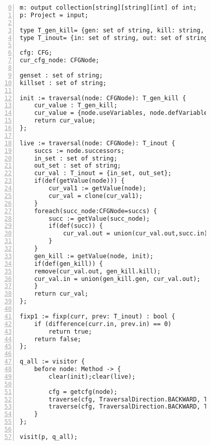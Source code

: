 \begin{figure}[ht!]
\begin{lstlisting}[numbers=left, tabsize=4, escapechar=@, caption={Live variable analysis},label={lst:live-variable},firstline=0, firstnumber=0, lastline = 55] 
m: output collection[string][string][int] of int;
p: Project = input;

type T_gen_kill= {gen: set of string, kill: string, dummy : int};
type T_inout= {in: set of string, out: set of string};

cfg: CFG;
cur_cfg_node: CFGNode;

genset : set of string;
killset : set of string;

init := traversal(node: CFGNode): T_gen_kill {
	cur_value : T_gen_kill;
	cur_value = {node.useVariables, node.defVariables, 0};
	return cur_value;
};

live := traversal(node: CFGNode): T_inout {
	succs := node.successors;
	in_set : set of string;
	out_set : set of string;
	cur_val : T_inout = {in_set, out_set};
	if(def(getValue(node))) {
		cur_val1 := getValue(node);
		cur_val = clone(cur_val1);
	}
	foreach(succ_node:CFGNode=succs) {
		succ := getValue(succ_node);
		if(def(succ)) {
			cur_val.out = union(cur_val.out,succ.in);
		}
	}
	gen_kill := getValue(node, init);
	if(def(gen_kill)) {
	remove(cur_val.out, gen_kill.kill);
	cur_val.in = union(gen_kill.gen, cur_val.out);
	}
	return cur_val;
};

fixp1 := fixp(curr, prev: T_inout) : bool {
	if (difference(curr.in, prev.in) == 0)
		return true;	
	return false;
};

q_all := visitor {
	before node: Method -> {
		clear(init);clear(live);

		cfg = getcfg(node);
		traverse(cfg, TraversalDirection.BACKWARD, TraversalKind.HYBRID, init);
		traverse(cfg, TraversalDirection.BACKWARD, TraversalKind.HYBRID, live, fixp1);
	}
};

visit(p, q_all);
\end{lstlisting}
\end{figure}